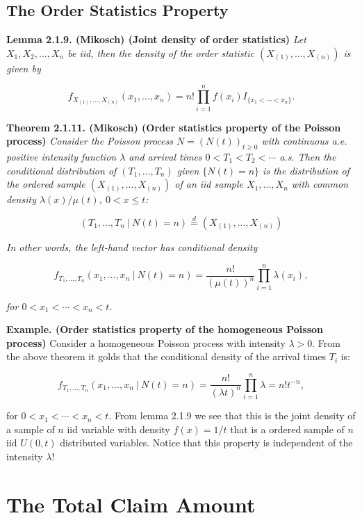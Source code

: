 \documentclass[a4paper,12pt,openany]{book}
\begin{document}
\hypertarget{the-order-statistics-property}{%
\subsection{The Order Statistics Property}\label{the-order-statistics-property}}

\textbf{Lemma 2.1.9. (Mikosch) (Joint density of order statistics)} \emph{Let \(X_1,X_2,...,X_n\) be iid, then the density of the order statistic \((X_{(1)},...,X_{(n)})\) is given by}

\[
f_{X_{(1)},...,X_{(n)}}(x_1,...,x_n)=n!\prod_{i=1}^n f(x_i)I_{\{x_1<\cdots <x_n\}}.
\]

\textbf{Theorem 2.1.11. (Mikosch) (Order statistics property of the Poisson process)} \emph{Consider the Poisson process \(N = (N(t))_{t\ge 0}\) with continuous a.e. positive intensity function \(\lambda\) and arrival times \(0 < T_1 < T_2 < \cdots\) a.s. Then the conditional distribution of \((T_1 ,..., T_n )\) given \(\{N (t) = n\}\) is the distribution of the ordered sample \((X_{(1)}, ... , X_{(n)})\) of an iid sample \(X_1,..., X_n\) with common density \(\lambda(x)/\mu(t)\), \(0 < x \le t\):}

\[
(T_1,...,T_n\ \vert\ N(t)=n)\stackrel{d}{=}(X_{(1)},...,X_{(n)})
\]

\emph{In other words, the left-hand vector has conditional density}

\[
f_{T_1,...,T_n}(x_1,...,x_n\ \vert\ N(t)=n)=\frac{n!}{(\mu(t))^n}\prod_{i=1}^n\lambda(x_i),
\]

\emph{for \(0<x_1<\cdots < x_n<t\).}

\textbf{Example. (Order statistics property of the homogeneous Poisson process)} Consider a homogeneous Poisson process with intensity \(\lambda> 0\). From the above theorem it golds that the conditional density of the arrival times \(T_i\) is:

\[
f_{T_1,...,T_n}(x_1,...,x_n\ \vert\ N(t)=n)=\frac{n!}{(\lambda t)^n}\prod_{i=1}^n\lambda=n!t^{-n},
\]

for \(0<x_1<\cdots < x_n<t\). From lemma 2.1.9 we see that this is the joint density of a sample of \(n\) iid variable with density \(f(x)=1/t\) that is a ordered sample of \(n\) iid \(U(0,t)\) distributed variables. Notice that this property is independent of the intensity \(\lambda\)!

\hypertarget{the-total-claim-amount}{%
\section{The Total Claim Amount}\label{the-total-claim-amount}}
\end{document}
